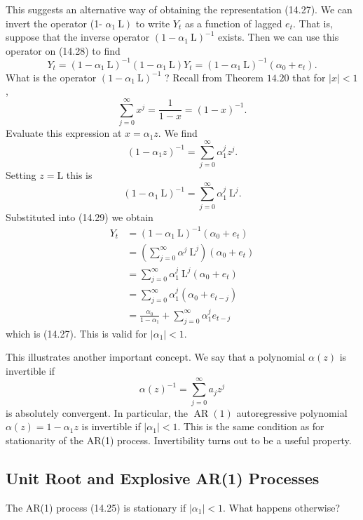 \documentclass[10pt]{article}
\begin{document}
This suggests an alternative way of obtaining the representation (14.27). We can invert the operator (1- $\left.\alpha_{1} \mathrm{~L}\right)$ to write $Y_{t}$ as a function of lagged $e_{t}$. That is, suppose that the inverse operator $\left(1-\alpha_{1} \mathrm{~L}\right)^{-1}$ exists. Then we can use this operator on (14.28) to find
$$
Y_{t}=\left(1-\alpha_{1} \mathrm{~L}\right)^{-1}\left(1-\alpha_{1} \mathrm{~L}\right) Y_{t}=\left(1-\alpha_{1} \mathrm{~L}\right)^{-1}\left(\alpha_{0}+e_{t}\right) .
$$
What is the operator $\left(1-\alpha_{1} \mathrm{~L}\right)^{-1}$ ? Recall from Theorem $14.20$ that for $|x|<1$,
$$
\sum_{j=0}^{\infty} x^{j}=\frac{1}{1-x}=(1-x)^{-1} .
$$
Evaluate this expression at $x=\alpha_{1} z$. We find
$$
\left(1-\alpha_{1} z\right)^{-1}=\sum_{j=0}^{\infty} \alpha_{1}^{j} z^{j} .
$$
Setting $z=\mathrm{L}$ this is
$$
\left(1-\alpha_{1} \mathrm{~L}\right)^{-1}=\sum_{j=0}^{\infty} \alpha_{1}^{j} \mathrm{~L}^{j} .
$$
Substituted into (14.29) we obtain
$$
\begin{aligned}
Y_{t} &=\left(1-\alpha_{1} \mathrm{~L}\right)^{-1}\left(\alpha_{0}+e_{t}\right) \\
&=\left(\sum_{j=0}^{\infty} \alpha^{j} \mathrm{~L}^{j}\right)\left(\alpha_{0}+e_{t}\right) \\
&=\sum_{j=0}^{\infty} \alpha_{1}^{j} \mathrm{~L}^{j}\left(\alpha_{0}+e_{t}\right) \\
&=\sum_{j=0}^{\infty} \alpha_{1}^{j}\left(\alpha_{0}+e_{t-j}\right) \\
&=\frac{\alpha_{0}}{1-\alpha_{1}}+\sum_{j=0}^{\infty} \alpha_{1}^{j} e_{t-j}
\end{aligned}
$$
which is (14.27). This is valid for $\left|\alpha_{1}\right|<1$.

This illustrates another important concept. We say that a polynomial $\alpha(z)$ is invertible if
$$
\alpha(z)^{-1}=\sum_{j=0}^{\infty} a_{j} z^{j}
$$
is absolutely convergent. In particular, the $\operatorname{AR}(1)$ autoregressive polynomial $\alpha(z)=1-\alpha_{1} z$ is invertible if $\left|\alpha_{1}\right|<1$. This is the same condition as for stationarity of the AR(1) process. Invertibility turns out to be a useful property.

\subsection{Unit Root and Explosive AR(1) Processes}
The AR(1) process (14.25) is stationary if $\left|\alpha_{1}\right|<1$. What happens otherwise?
\end{document}
